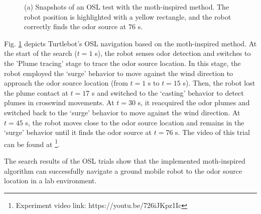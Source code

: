 \begin{figure}[h!]
\begin{center}
    \hspace*{0.04in}
    \hspace*{0.04in}
    \hspace*{0.04in}
\end{center}
\vspace{-.1in}

\caption
{(a) Snapshots of an OSL test with the moth-inspired method. The robot position is highlighted with a yellow rectangle, and the robot correctly finds the odor source at $76$ s.}
\label{fig:olfaction_snapshots}
\end{figure}


Fig. \ref{fig:olfaction_snapshots} depicts Turtlebot's OSL navigation based on the moth-inspired method. At the start of the search ($t=1$ s), the robot senses odor detection and switches to the 'Plume tracing' stage to trace the odor source location. In this stage, the robot employed the `surge' behavior to move against the wind direction to approach the odor source location (from $t=1$ s to $t=15$ s). Then, the robot lost the plume contact at $t=17$ s and switched to the `casting' behavior to detect plumes in crosswind movements. At $t=30$ s, it reacquired the odor plumes and switched back to the `surge' behavior to move against the wind direction. At $t=45$ s, the robot moves close to the odor source location and remains in the `surge' behavior until it finds the odor source at $t=76$ s. The video of this trial can be found at \footnote{Experiment video link: https://youtu.be/726iJKpz1Ic}.   

The search results of the OSL trials show that the implemented moth-inspired algorithm can successfully navigate a ground mobile robot to the odor source location in a lab environment.